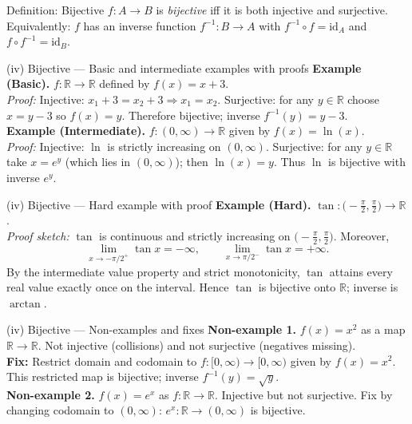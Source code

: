 \documentclass[11pt]{beamer}
\theoremstyle{plain}
\begin{document}
\begin{frame}{Definition: Bijective}
  \(f\colon A\to B\) is \emph{bijective} iff it is both injective and surjective.\\[6pt]
  Equivalently: \(f\) has an inverse function \(f^{-1}\colon B\to A\) with \(f^{-1}\circ f=\mathrm{id}_A\) and \(f\circ f^{-1}=\mathrm{id}_B\).
\end{frame}

\begin{frame}{(iv) Bijective — Basic and intermediate examples with proofs}
  \textbf{Example (Basic).} \(f\colon\mathbb{R}\to\mathbb{R}\) defined by \(f(x)=x+3\).\\[6pt]
  \pause
  \emph{Proof:} Injective: \(x_1+3=x_2+3\Rightarrow x_1=x_2\). Surjective: for any \(y\in\mathbb{R}\) choose \(x=y-3\) so \(f(x)=y\). Therefore bijective; inverse \(f^{-1}(y)=y-3\).\\[8pt]

  \textbf{Example (Intermediate).} \(f\colon(0,\infty)\to\mathbb{R}\) given by \(f(x)=\ln(x)\).\\
  \pause
  \emph{Proof:} Injective: \(\ln\) is strictly increasing on \((0,\infty)\). Surjective: for any \(y\in\mathbb{R}\) take \(x=e^y\) (which lies in \((0,\infty)\)); then \(\ln(x)=y\). Thus \(\ln\) is bijective with inverse \(e^y\).
\end{frame}

\begin{frame}{(iv) Bijective — Hard example with proof}
  \textbf{Example (Hard).} \(\tan\colon\big(-\tfrac{\pi}{2},\tfrac{\pi}{2}\big)\to\mathbb{R}\).\\[6pt]
  \pause
  \emph{Proof sketch:} \(\tan\) is continuous and strictly increasing on \(\big(-\tfrac{\pi}{2},\tfrac{\pi}{2}\big)\). Moreover,
  \[
    \lim_{x\to -\pi/2^+}\tan x = -\infty,\qquad
    \lim_{x\to \pi/2^-}\tan x = +\infty.
  \]
  By the intermediate value property and strict monotonicity, \(\tan\) attains every real value exactly once on the interval. Hence \(\tan\) is bijective onto \(\mathbb{R}\); inverse is \(\arctan\).
\end{frame}

\begin{frame}{(iv) Bijective — Non-examples and fixes}
  \textbf{Non-example 1.} \(f(x)=x^2\) as a map \(\mathbb{R}\to\mathbb{R}\). Not injective (collisions) and not surjective (negatives missing).\\[6pt]
  \pause
  \textbf{Fix:} Restrict domain and codomain to \(f\colon[0,\infty)\to[0,\infty)\) given by \(f(x)=x^2\). This restricted map is bijective; inverse \(f^{-1}(y)=\sqrt{y}\).\\[6pt]
  \textbf{Non-example 2.} \(f(x)=e^x\) as \(f\colon\mathbb{R}\to\mathbb{R}\). Injective but not surjective. Fix by changing codomain to \((0,\infty)\): \(e^x\colon\mathbb{R}\to(0,\infty)\) is bijective.
\end{frame}
\end{document}
